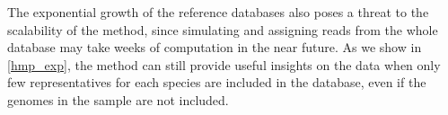 The exponential growth of the reference databases also poses a threat to the scalability of the method, since simulating and assigning reads from the whole database may take weeks of computation in the near future. As we show in \ref{hmp_exp}, the method can still provide useful insights on the data when only few representatives for each species are included in the database, even if the genomes in the sample are not included.
